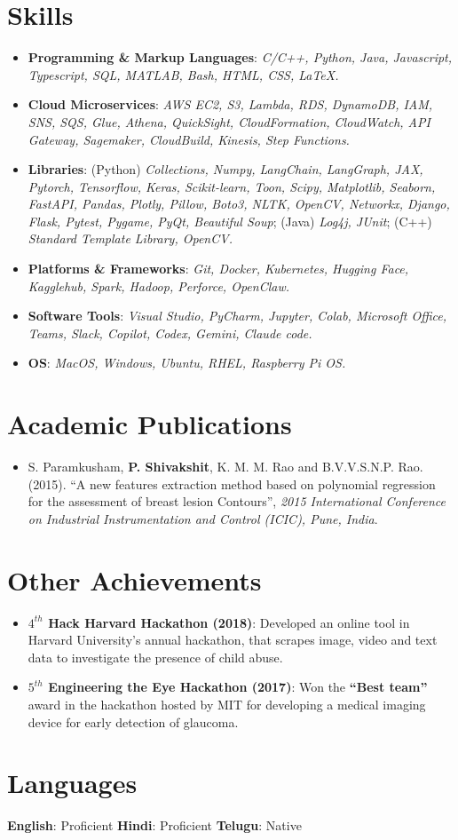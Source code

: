 \documentclass[letterpaper,11pt]{article}
\newcommand{\resumeItem}[2]{
  \item\small{
    \textbf{#1}{: #2 \vspace{-2pt}}
  }
}
\newcommand{\resumeSubItem}[2]{\resumeItem{#1}{#2}\vspace{-4pt}}
\newcommand{\resumeSubHeadingListStart}{\begin{itemize}[leftmargin=*]}
\newcommand{\resumeSubHeadingListEnd}{\end{itemize}}
\begin{document}
\section{Skills}
 \resumeSubHeadingListStart
   \item{
     \textbf{Programming \& Markup Languages}: \textit{C/C++, Python, Java, Javascript, Typescript, SQL, MATLAB, Bash, HTML, CSS, \LaTeX.}}
    \item{
     \textbf{Cloud Microservices}: \textit{AWS EC2, S3, Lambda, RDS, DynamoDB, IAM, SNS, SQS, Glue, Athena, QuickSight, CloudFormation, CloudWatch, API Gateway, Sagemaker, CloudBuild, Kinesis, Step Functions.}}
     
    \item{
    \textbf{Libraries}:
    (Python) \textit{Collections, Numpy, LangChain, LangGraph, JAX, Pytorch, Tensorflow, Keras, Scikit-learn, Toon,  Scipy, Matplotlib, Seaborn, FastAPI, Pandas, Plotly, Pillow, Boto3, NLTK, OpenCV, Networkx, Django, Flask, Pytest, Pygame, PyQt, Beautiful Soup}; (Java) \textit{Log4j, JUnit}; (C++) \textit{Standard Template Library, OpenCV.}
    }
    \item{
    \textbf{Platforms \& Frameworks}: \textit{Git, Docker, Kubernetes, Hugging Face, Kagglehub, Spark, Hadoop, Perforce, OpenClaw.}
    }
    \item{
    \textbf{Software Tools}: \textit{Visual Studio, PyCharm, Jupyter, Colab, Microsoft Office, Teams, Slack, Copilot, Codex, Gemini, Claude code.
    }}
    \item{
    \textbf{OS}: \textit{MacOS, Windows, Ubuntu, RHEL, Raspberry Pi OS.}
    }
 \resumeSubHeadingListEnd

\section{Academic Publications}
    \begin{itemize}
        \item S. Paramkusham, \textbf{P. Shivakshit}, K. M. M. Rao and B.V.V.S.N.P. Rao. (2015). ``A new features extraction method based on polynomial regression for the assessment of breast lesion Contours'', \textit{2015 International Conference on Industrial Instrumentation and Control (ICIC), Pune, India}.
    \end{itemize}

\section{Other Achievements}
  \resumeSubHeadingListStart
    \resumeSubItem{\boldmath $4^{th}$ Hack Harvard Hackathon (2018)}
      {Developed an online tool in Harvard University's annual hackathon, that scrapes image, video and text data to investigate the presence of child abuse.}
    \resumeSubItem{\boldmath $5^{th}$ Engineering the Eye Hackathon (2017)}
      {Won the \textbf{``Best team''} award in the hackathon hosted by MIT for developing a medical imaging device for early detection of glaucoma.}
  \resumeSubHeadingListEnd

\section{Languages}
\textbf{English}: Proficient
\hfill \textbf{Hindi}: Proficient
\hfill \textbf{Telugu}: Native
\end{document}
